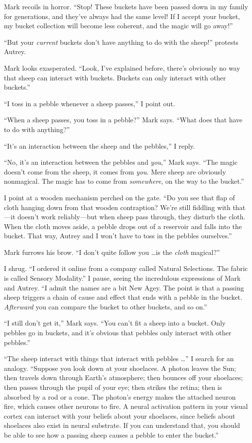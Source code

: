 {
 Mark recoils in horror. ``Stop! These buckets
have been passed down in my family for generations, and
they've always had the same level! If I accept your
bucket, my bucket collection will become less coherent, and the magic
will go away!''}

{
 ``But your \textit{current} buckets
don't have anything to do with the
sheep!'' protests Autrey.}

{
 Mark looks exasperated. ``Look,
I've explained before, there's
obviously no way that sheep can interact with buckets. Buckets can only
interact with other buckets.''}

{
 ``I toss in a pebble whenever a sheep
passes,'' I point out.}

{
 ``When a sheep passes, you toss in a
pebble?'' Mark says. ``What does
that have to do with anything?''}

{
 ``It's an interaction between the
sheep and the pebbles,'' I reply.}

{
 ``No, it's an interaction between
the pebbles and \textit{you},'' Mark says.
``The magic doesn't come from the
sheep, it comes from \textit{you}. Mere sheep are obviously nonmagical.
The magic has to come from \textit{somewhere}, on the way to the
bucket.''}

{
 I point at a wooden mechanism perched on the gate.
``Do you see that flap of cloth hanging down from that
wooden contraption? We're still fiddling with that---it
doesn't work reliably---but when sheep pass through,
they disturb the cloth. When the cloth moves aside, a pebble drops out
of a reservoir and falls into the bucket. That way, Autrey and I
won't have to toss in the pebbles
ourselves.''}

{
 Mark furrows his brow. ``I don't
quite follow you \ldots is the \textit{cloth}
magical?''}

{
 I shrug. ``I ordered it online from a company
called Natural Selections. The fabric is called Sensory
Modality.'' I pause, seeing the incredulous
expressions of Mark and Autrey. ``I admit the names
are a bit New Agey. The point is that a passing sheep triggers a chain
of cause and effect that ends with a pebble in the bucket.
\textit{Afterward} you can compare the bucket to other buckets, and so
on.''}

{
 ``I still don't get
it,'' Mark says. ``You
can't fit a sheep into a bucket. Only pebbles go in
buckets, and it's obvious that pebbles only interact
with other pebbles.''}

{
 ``The sheep interact with things that interact
with pebbles \ldots'' I search for an analogy.
``Suppose you look down at your shoelaces. A photon
leaves the Sun; then travels down through Earth's
atmosphere; then bounces off your shoelaces; then passes through the
pupil of your eye; then strikes the retina; then is absorbed by a rod
or a cone. The photon's energy makes the attached
neuron fire, which causes other neurons to fire. A neural activation
pattern in your visual cortex can interact with your beliefs about your
shoelaces, since beliefs about shoelaces also exist in neural
substrate. If you can understand that, you should be able to see how a
passing sheep causes a pebble to enter the bucket.''}

